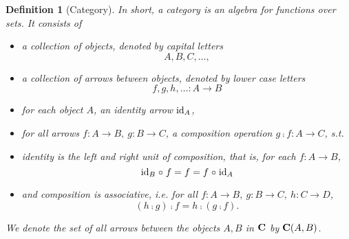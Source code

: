 \documentclass{article}
\newtheorem{definition}[theorem]{Definition}
\begin{document}
\begin{definition}[Category] \normalfont
  In short, a \emph{category} is an algebra for functions over sets. It consists of
  \begin{itemize}
  \item a collection of objects, denoted by capital letters \[A,B,C,\ldots,\]
  \item a collection of arrows between objects, denoted by lower case letters \[f,g,h,\ldots : A \rightarrow B\]
  \item for each object $A$, an \emph{identity} arrow $\operatorname{id}_A$,
  \item for all arrows $f:A \rightarrow B,\ g:B \rightarrow C$, a \emph{composition} operation $g \comp f : A \rightarrow C$, s.t.
  \item identity is the left and right unit of composition, that is, for each $f: A \rightarrow B$, \[ \operatorname{id}_B \mathrel{\circ} f = f = f \mathrel{\circ} \operatorname{id}_A \]
  \item and composition is associative, i.e. for all $f: A \rightarrow B,\ g: B \rightarrow C,\ h:C \rightarrow D$, \[ (h \comp g) \comp f = h \comp (g \comp f). \]
  \end{itemize}
  We denote the set of all arrows between the objects $A,B$ in $\mathbf{C}$ by $\mathbf{C}(A,B)$.
\end{definition}
\end{document}

